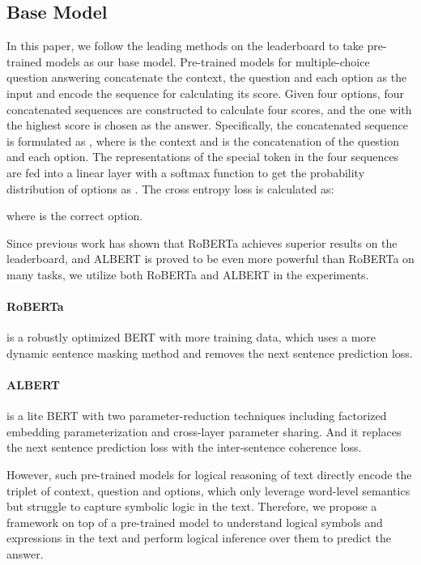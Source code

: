 \documentclass[11pt,a4paper]{article}
\begin{document}
\subsection{Base Model}
\label{section_base_model}
In this paper, we follow the leading methods on the leaderboard to take pre-trained models as our base model.
Pre-trained models for multiple-choice question answering concatenate the context, the question and each option as the input and encode the sequence for calculating its score. Given four options, four concatenated sequences are constructed to calculate four scores, and the one with the highest score is chosen as the answer. 
Specifically, the concatenated sequence is formulated as , where  is the context and  is the concatenation of the question and each option.
The representations of the special token  in the four sequences are fed into a linear layer with a softmax function to get the probability distribution of options as . 
The cross entropy loss is calculated as:

where  is the correct option.

Since previous work \cite{yu2020reclor} has shown that RoBERTa \cite{liu2019roberta} achieves superior results on the leaderboard, and ALBERT \cite{lan2019albert} is proved to be even more powerful than RoBERTa on many tasks, we utilize both RoBERTa and ALBERT in the experiments.
\paragraph{RoBERTa} is a robustly optimized BERT \cite{devlin2019bert} with more training data, which uses a more dynamic sentence masking method and removes the next sentence prediction loss.
\paragraph{ALBERT} is a lite BERT with two parameter-reduction techniques including factorized embedding parameterization and cross-layer parameter sharing. And it replaces the next sentence prediction loss with the inter-sentence coherence loss. 

However, such pre-trained models for logical reasoning of text directly encode the triplet of context, question and options, which only leverage word-level semantics but struggle to capture symbolic logic in the text.
Therefore, we propose a framework on top of a pre-trained model to understand logical symbols and expressions in the text and perform logical inference over them to predict the answer.
\end{document}
